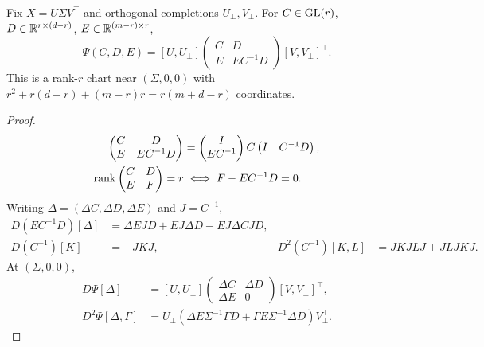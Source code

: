 \begin{proposition}
\label{prop:schur-chart}
Fix $X=U\Sigma V^\top$ and orthogonal completions $U_\perp,V_\perp$.
For $C\in{\rm GL}(r)$,
$D\in\mathbb R^{r\times(d-r)}$, $E\in\mathbb R^{(m-r)\times r}$,
\begin{equation}
\Psi(C,D,E)=[U,U_\perp]
\begin{pmatrix}C&D\\E&EC^{-1}D\end{pmatrix}[V,V_\perp]^\top .
\label{eq:schur-chart}
\end{equation}
This is a rank-$r$ chart near $(\Sigma,0,0)$ with
$r^2+r(d-r)+(m-r)r=r(m+d-r)$ coordinates.
\end{proposition}
\begin{proof}
\begin{align}
\begin{pmatrix}C&D\\E&EC^{-1}D\end{pmatrix}
&=\begin{pmatrix}I\\EC^{-1}\end{pmatrix}C
\begin{pmatrix}I&C^{-1}D\end{pmatrix},\\
\operatorname{rank}\begin{pmatrix}C&D\\E&F\end{pmatrix}=r
&\iff F-EC^{-1}D=0.
\end{align}
Writing $\Delta=(\Delta C,\Delta D,\Delta E)$ and $J=C^{-1}$,
\begin{align}
D(EC^{-1}D)[\Delta]&=\Delta EJD+EJ\Delta D-EJ\Delta CJD,\\
D(C^{-1})[K]&=-JKJ,&
D^2(C^{-1})[K,L]&=JKJLJ+JLJKJ .
\end{align}
At $(\Sigma,0,0)$,
\begin{align}
D\Psi[\Delta]&=[U,U_\perp]
\begin{pmatrix}\Delta C&\Delta D\\\Delta E&0\end{pmatrix}
[V,V_\perp]^\top,\\
D^2\Psi[\Delta,\Gamma]&=
U_\perp(\Delta E\Sigma^{-1}\Gamma D+
\Gamma E\Sigma^{-1}\Delta D)V_\perp^\top .
\label{eq:schur-second}
\end{align}
\end{proof}

